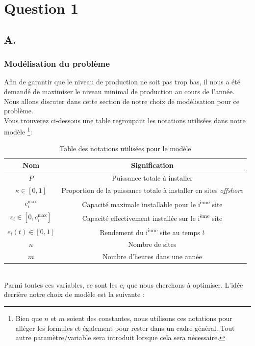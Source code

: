 \documentclass{article}
\newlength{\temp}
\begin{document}


\section*{Question 1}

\subsection*{A.}
\subsubsection*{Modélisation du problème}
Afin de garantir que le niveau de production ne soit pas trop bas, il nous a été demandé de maximiser le niveau minimal de production au cours de l'année. Nous allons discuter dans cette section de notre choix de modélisation pour ce problème.\\
Vous trouverez ci-dessous une table regroupant les notations utilisées dans notre modèle \footnote{Bien que $n$ et $m$ soient des constantes, nous utilisons ces notations pour alléger les formules et également pour rester dans un cadre général. Tout autre paramètre/variable sera introduit lorsque cela sera nécessaire.}:
\begin{table}[h!]
\centering
\renewcommand{\arraystretch}{1.5}%
\begin{tabular}{|c || c |} 
 \hline
Nom & Signification\\
 \hline\hline
 $P$  & Puissance totale à installer\\
 $\kappa \in [0, 1]$ & Proportion de la puissance totale à installer en sites \textit{offshore}\\
 $c^\text{max}_i$ & Capacité maximale installable pour le i\textsuperscript{ème} site\\
 $c_i \in [0, c_i^{\max}]$ & Capacité effectivement installée sur le i\textsuperscript{ème} site\\
 $e_i(t) \in [0,1]$ & Rendement du i\textsuperscript{ème} site au temps $t$\\
 $n$ & Nombre de sites\\
 $m$ & Nombre d'heures dans une année\\
 \hline
\end{tabular}
\caption{Table des notations utilisées pour le modèle}
\label{table:noms_des_variables}
\end{table}
\noindent \\
Parmi toutes ces variables, ce sont les $c_i$ que nous cherchons à optimiser. L'idée derrière notre choix de modèle est la suivante : \\
\end{document}
